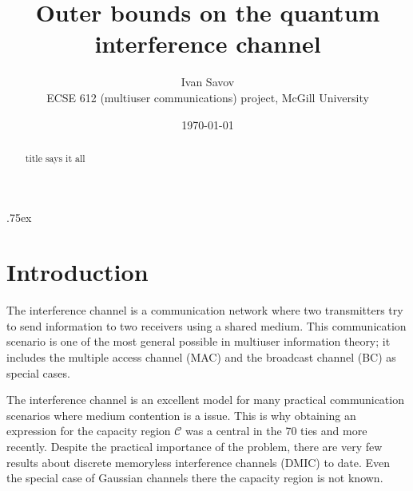 \documentclass[aps,11pt,twoside,letterpaper]{article}
\begin{document}
\title{{\Large Outer bounds on the quantum interference channel} }
\date{\today} 
\author{Ivan Savov \\
    ECSE 612 (multiuser communications) project, McGill University}




\parskip .75ex             %
\maketitle

\begin{abstract}
    title says it all
\end{abstract}


\section{Introduction}


    The interference channel is a communication network where two transmitters try to send
    information to two receivers using a shared medium. 
    This communication scenario is one of the most general possible in multiuser information
    theory; it includes the multiple access channel (MAC) and the broadcast channel (BC)
    as special cases.
    
    The interference channel is an excellent model for many practical communication scenarios
    where medium contention is a issue. This is why obtaining an expression for the capacity region
    $\mathcal{C}$ was a central in the 70 ties and more recently.
    Despite the practical importance of the problem, there are very few results about 
    discrete memoryless interference channels (DMIC) to date.
    Even the special case of Gaussian channels there the capacity region is not known.
    
\end{document}
